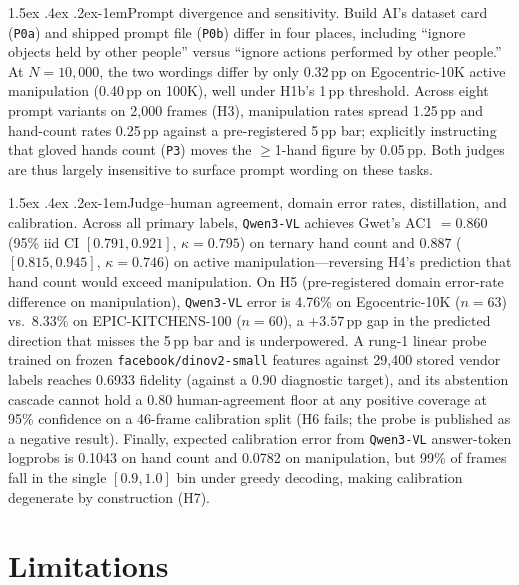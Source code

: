 \documentclass[11pt]{article}
\makeatletter
\renewcommand\paragraph{\@startsection{paragraph}{4}{\z@}%
  {1.5ex \@plus .4ex \@minus .2ex}{-1em}{\normalfont\normalsize\bfseries}}
\makeatother
\begin{document}
\paragraph{Prompt divergence and sensitivity.}
Build AI's dataset card (\texttt{P0a}) and shipped prompt file (\texttt{P0b}) differ in four
places, including ``ignore objects held by other people'' versus ``ignore actions performed by
other people.'' At $N = 10{,}000$, the two wordings differ by only 0.32\,pp on Egocentric-10K
active manipulation (0.40\,pp on 100K), well under H1b's 1\,pp threshold. Across eight prompt
variants on 2{,}000 frames (H3), manipulation rates spread 1.25\,pp and hand-count rates 0.25\,pp
against a pre-registered 5\,pp bar; explicitly instructing that gloved hands count (\texttt{P3})
moves the $\geq$1-hand figure by 0.05\,pp. Both judges are thus largely insensitive to surface
prompt wording on these tasks.

\paragraph{Judge--human agreement, domain error rates, distillation, and calibration.}
Across all \vernierNPrimary{} primary labels, \texttt{Qwen3-VL} achieves Gwet's AC1 $= 0.860$
(95\% iid CI $[0.791, 0.921]$, $\kappa = 0.795$) on ternary hand count and $0.887$
($[0.815, 0.945]$, $\kappa = 0.746$) on active manipulation---reversing H4's prediction that hand
count would exceed manipulation. On H5 (pre-registered domain error-rate difference on
manipulation), \texttt{Qwen3-VL} error is 4.76\% on Egocentric-10K ($n=63$) vs.\ 8.33\% on
EPIC-KITCHENS-100 ($n=60$), a $+3.57$\,pp gap in the predicted direction that misses the 5\,pp bar
and is underpowered. A rung-1 linear probe trained on frozen \texttt{facebook/dinov2-small}
features against 29{,}400 stored vendor labels reaches 0.6933 fidelity (against a 0.90 diagnostic
target), and its abstention cascade cannot hold a 0.80 human-agreement floor at any positive
coverage at 95\% confidence on a 46-frame calibration split (H6 fails; the probe is published as a
negative result). Finally, expected calibration error from \texttt{Qwen3-VL} answer-token
logprobs is 0.1043 on hand count and 0.0782 on manipulation, but 99\% of frames fall in the single
$[0.9, 1.0]$ bin under greedy decoding, making calibration degenerate by construction (H7).

\section{Limitations}
\label{sec:limitations}
\end{document}
